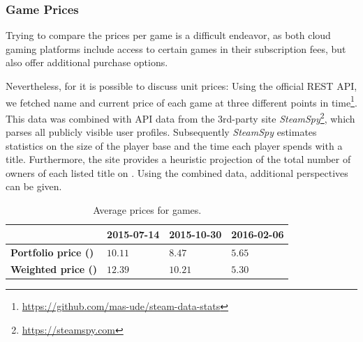 \subsubsection{Game Prices}

Trying to compare the prices per game is a difficult endeavor, as both cloud gaming platforms include access to certain games in their subscription fees, but also offer additional purchase options.




Nevertheless, for \steam it is possible to discuss unit prices: Using the official \acrshort{REST} \acrshort{API}, we fetched name and  current price of each game at three different points in time\footnote{\url{https://github.com/mas-ude/steam-data-stats}}. This data was combined with \acrshort{API} data from the 3rd-party site \textit{SteamSpy}\footnote{\url{https://steamspy.com}}, which parses all publicly visible \steam user profiles. Subsequently \textit{SteamSpy} estimates statistics on the size of the player base and the time each player spends with a title. Furthermore, the site provides a heuristic projection of the total number of owners of each listed title on \steam. Using the combined data, additional perspectives can be given.

\begin{table}
\centering
\caption{Average prices for \steam games.}
\label{tab:steam-price-stats}
\begin{tabu}{X[2]|X[r]X[r]X[r]}
	\toprule
	& \textbf{2015-07-14} & \textbf{2015-10-30} & \textbf{2016-02-06} \\
	\midrule
	\textbf{Portfolio price (\si{\EUR})} & $10.11$ & $8.47$ & $5.65$ \\
	\textbf{Weighted price (\si{\EUR})} & $12.39$ & $10.21$ & $5.30$ \\
	\bottomrule
\end{tabu}
\end{table}

